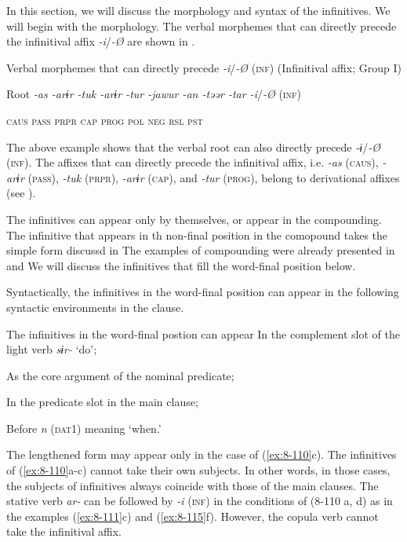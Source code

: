 In this section, we will discuss the morphology and syntax of the infinitives. We will begin with the morphology. The verbal morphemes that can directly precede the infinitival affix \textit{-i}/\textit{-Ø} are shown in .

\ea\label{ex:8-109}
  Verbal morphemes that can directly precede \textit{-i}/\textit{-Ø} (\textsc{inf}) (Infinitival affix; Group I)

  Root  \textit{-as  -arɨr  -tuk  -arɨr  -tur  -jawur  -an  -təər  -tar  -i}/\textit{-Ø} (\textsc{inf})

    \textsc{caus}  \textsc{pass}  \textsc{prpr}  \textsc{cap}  \textsc{prog}  \textsc{pol}  \textsc{neg}  \textsc{rsl}  \textsc{pst}
\z

The above example shows that the verbal root can also directly precede \textit{-ɨ}/\textit{-Ø} (\textsc{inf}). The affixes that can directly precede the infinitival affix, i.e. \textit{-as} (\textsc{caus}), \textit{-arɨr} (\textsc{pass}), \textit{-tuk} (\textsc{prpr}), \textit{-arɨr} (\textsc{cap}), and \textit{-tur} (\textsc{prog}), belong to derivational affixes (see ).

  The infinitives can appear only by themselves, or appear in the compounding. The infinitive that appears in th non-final position in the comopound takes the simple form discussd in  The examples of compounding were already presented in  and  We will discuss the infinitives that fill the word-final position below.

  Syntactically, the infinitives in the word-final position can appear in the following syntactic environments in the clause.

\ea\label{ex:8-110}
  The infinitives in the word-final postion can appear
\ea In the complement slot of the light verb \textit{sɨr-} ‘do’;

\ex As the core argument of the nominal predicate;

\ex In the predicate slot in the main clause;

\ex Before \textit{n} (\textsc{dat1}) meaning ‘when.’
\z
\z

The lengthened form may appear only in the case of (\ref{ex:8-110}c). The infinitives of (\ref{ex:8-110}a-c) cannot take their own subjects. In other words, in those cases, the subjects of infinitives always coincide with those of the main clauses. The stative verb \textit{ar-} can be followed by \textit{-i} (\textsc{inf}) in the conditions of (8-110 a, d) as in the examples (\ref{ex:8-111}c) and (\ref{ex:8-115}f). However, the copula verb cannot take the infinitival affix.

